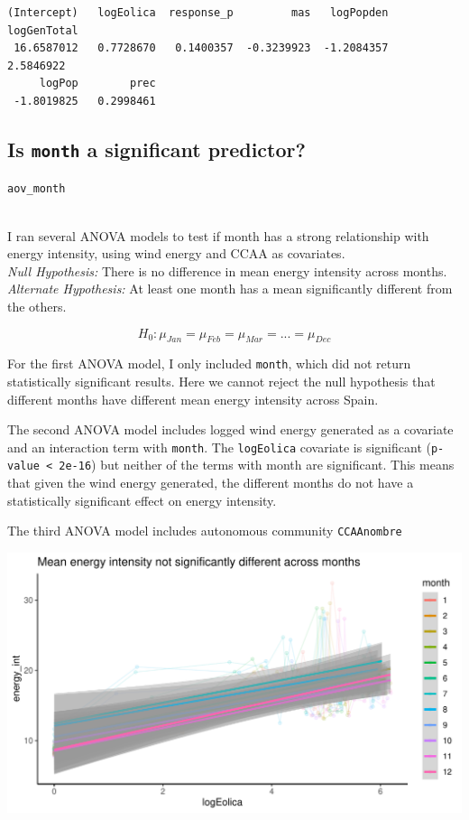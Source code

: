 \documentclass[
]{report}
\begin{document}
\begin{verbatim}
(Intercept)   logEolica  response_p         mas   logPopden logGenTotal 
 16.6587012   0.7728670   0.1400357  -0.3239923  -1.2084357   2.5846922 
     logPop        prec 
 -1.8019825   0.2998461 
\end{verbatim}

\hypertarget{is-month-a-significant-predictor}{%
\subsection{\texorpdfstring{Is \texttt{month} a significant
predictor?}{Is month a significant predictor?}}\label{is-month-a-significant-predictor}}

\texttt{aov\_month}\strut \\
I ran several ANOVA models to test if month has a strong relationship
with energy intensity, using wind energy and CCAA as covariates.\\
\emph{Null Hypothesis:} There is no difference in mean energy intensity
across months.\\
\emph{Alternate Hypothesis:} At least one month has a mean significantly
different from the others.

\[
H_0: \mu_{Jan} = \mu_{Feb} = \mu_{Mar} =  ...  = \mu_{Dec} 
\]

For the first ANOVA model, I only included \texttt{month}, which did not
return statistically significant results. Here we cannot reject the null
hypothesis that different months have different mean energy intensity
across Spain.

The second ANOVA model includes logged wind energy generated as a
covariate and an interaction term with \texttt{month}. The
\texttt{logEolica} covariate is significant
(\texttt{p-value\ \textless{}\ 2e-16}) but neither of the terms with
month are significant. This means that given the wind energy generated,
the different months do not have a statistically significant effect on
energy intensity.

The third ANOVA model includes autonomous community \texttt{CCAAnombre}

\includegraphics{Modelling_Energy_Intensity-V3_files/figure-pdf/aov-1.pdf}
\end{document}
